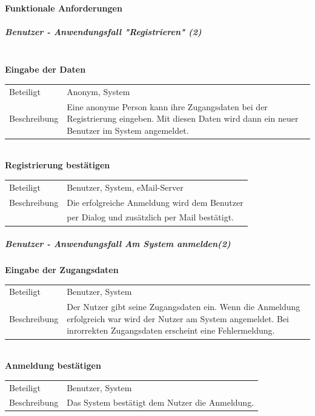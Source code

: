 \documentclass[12pt,a4paper]{article}
\begin{document}
\paragraph{Funktionale Anforderungen}
\subparagraph{Benutzer - Anwendungsfall "Registrieren" (2)}\mbox{}\\
\textbf{Eingabe der Daten}\\
\begin{tabular}{l| p{12cm}}
\hline 
Beteiligt & Anonym, System \\ 
Beschreibung & Eine anonyme Person kann ihre Zugangsdaten bei der Registrierung eingeben. Mit diesen Daten wird dann ein neuer Benutzer im System angemeldet.\\ 
\end{tabular}\\

\textbf{Registrierung bestätigen}\\
\begin{tabular}{l|p{12cm}}
\hline 
Beteiligt    & Benutzer, System, eMail-Server \\ 
Beschreibung & Die erfolgreiche Anmeldung wird dem Benutzer  \\
 			 & per Dialog und zusätzlich per Mail bestätigt. \\ 
\end{tabular} 

\newpage
\subparagraph{Benutzer - Anwendungsfall \glqq Am System anmelden\grqq (2)}\mbox{}

\textbf{Eingabe der Zugangsdaten}\\
\begin{tabular}{l|p{12cm}}
\hline 
Beteiligt & Benutzer, System \\ 
Beschreibung & Der Nutzer gibt seine Zugangsdaten ein. Wenn die Anmeldung erfolgreich war wird der Nutzer am System angemeldet. Bei inrorrekten Zugangsdaten erscheint eine Fehlermeldung. \\ 
\end{tabular}\\


\textbf{Anmeldung bestätigen}\\
\begin{tabular}{l|p{12cm}}
\hline 
Beteiligt & Benutzer, System \\ 
Beschreibung & Das System bestätigt dem Nutzer die Anmeldung. \\ 
\end{tabular}\\\\
\end{document}
